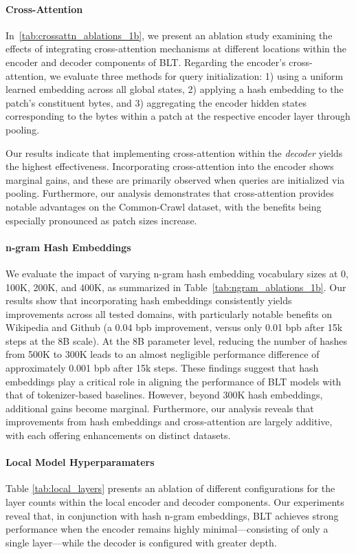 \paragraph{Cross-Attention} 
In~\autoref{tab:crossattn_ablations_1b}, we present an ablation study examining the effects of integrating cross-attention mechanisms at different locations within the encoder and decoder components of {\textsc BLT}. Regarding the encoder’s cross-attention, we evaluate three methods for query initialization: 1) using a uniform learned embedding across all global states, 2) applying a hash embedding to the patch’s constituent bytes, and 3) aggregating the encoder hidden states corresponding to the bytes within a patch at the respective encoder layer through pooling.

Our results indicate that implementing cross-attention within the \textit{decoder} yields the highest effectiveness. Incorporating cross-attention into the encoder shows marginal gains, and these are primarily observed when queries are initialized via pooling. Furthermore, our analysis demonstrates that cross-attention provides notable advantages on the Common-Crawl dataset, with the benefits being especially pronounced as patch sizes increase.

\paragraph{n-gram Hash Embeddings} 

We evaluate the impact of varying n-gram hash embedding vocabulary sizes at 0, 100K, 200K, and 400K, as summarized in Table~\ref{tab:ngram_ablations_1b}. Our results show that incorporating hash embeddings consistently yields improvements across all tested domains, with particularly notable benefits on Wikipedia and Github (a 0.04 bpb improvement, versus only 0.01 bpb after 15k steps at the 8B scale). At the 8B parameter level, reducing the number of hashes from 500K to 300K leads to an almost negligible performance difference of approximately 0.001 bpb after 15k steps. These findings suggest that hash embeddings play a critical role in aligning the performance of {\textsc BLT} models with that of tokenizer-based baselines. However, beyond 300K hash embeddings, additional gains become marginal. Furthermore, our analysis reveals that improvements from hash embeddings and cross-attention are largely additive, with each offering enhancements on distinct datasets.

\paragraph{Local Model Hyperparamaters} Table \ref{tab:local_layers} presents an ablation of different configurations for the layer counts within the local encoder and decoder components. Our experiments reveal that, in conjunction with hash n-gram embeddings, {\textsc BLT} achieves strong performance when the encoder remains highly minimal—consisting of only a single layer—while the decoder is configured with greater depth.

